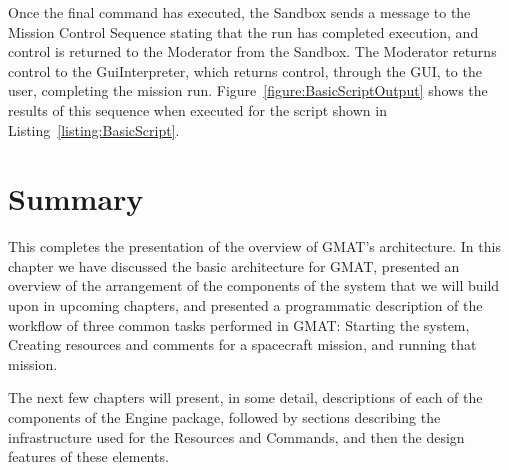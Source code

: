 Once the final command has executed, the Sandbox sends a message to the Mission Control Sequence
stating that the run has completed execution, and control is returned to the Moderator from the
Sandbox.  The Moderator returns control to the GuiInterpreter, which returns control, through the
GUI, to the user, completing the mission run.  Figure~\ref{figure:BasicScriptOutput} shows the
results of this sequence when executed for the script shown in Listing~\ref{listing:BasicScript}.

\section{Summary}

This completes the presentation of the overview of GMAT's architecture.  In this chapter we have
discussed the basic architecture for GMAT, presented an overview of the arrangement of the
components of the system that we will build upon in upcoming chapters, and presented a programmatic
description of the workflow of three common tasks performed in GMAT: Starting the system, Creating
resources and comments for a spacecraft mission, and running that mission.

The next few chapters will present, in some detail, descriptions of each of the components of the
Engine package, followed by sections describing the infrastructure used for the Resources and
Commands, and then the design features of these elements.